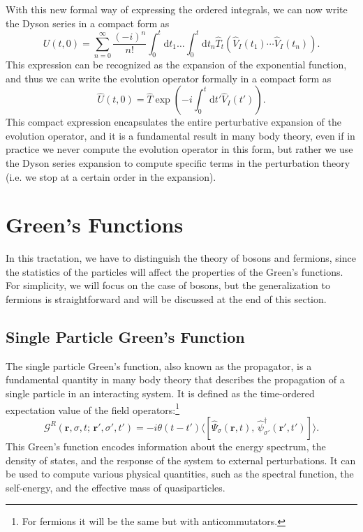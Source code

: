 With this new formal way of expressing the ordered integrals, we can now write the Dyson series in a compact form as
\[
    U(t,0) = \sum_{n=0}^\infty \frac{(-i)^n}{n!} \int_0^t \mathrm{d} t_1 \dots \int_0^t \mathrm{d} t_n \hat{T}_t \left( \hat{V}_I(t_1) \cdots \hat{V}_I(t_n) \right).
\]
This expression can be recognized as the expansion of the exponential function, and thus we can write the evolution operator formally in a compact form as
\[
    \hat{U}(t,0) = \hat{T} \exp\left( -i \int_0^t \mathrm{d} t' \hat{V}_I(t') \right).
\]
This compact expression encapsulates the entire perturbative expansion of the evolution operator, and it is a fundamental result in many body theory, even if in practice we never compute the evolution operator in this form, but rather we use the Dyson series expansion to compute specific terms in the perturbation theory (i.e. we stop at a certain order in the expansion).

\section{Green's Functions}

In this tractation, we have to distinguish the theory of bosons and fermions, since the statistics of the particles will affect the properties of the Green's functions. For simplicity, we will focus on the case of bosons, but the generalization to fermions is straightforward and will be discussed at the end of this section.

\subsection{Single Particle Green's Function}

The single particle Green's function, also known as the propagator, is a fundamental quantity in many body theory that describes the propagation of a single particle in an interacting system. It is defined as the time-ordered expectation value of the field operators:\footnote{For fermions it will be the same but with anticommutators.}
\[
    \mathcal{G}^R(\mathbf{r}, \sigma, t;\,\mathbf{r}', \sigma', t') = -i \theta(t - t') \langle [\hat{\Psi}_{\sigma} (\mathbf{r}, t),\, \hat{\psi}_{\sigma'}^\dagger(\mathbf{r}', t')] \rangle.
\]
This Green's function encodes information about the energy spectrum, the density of states, and the response of the system to external perturbations. It can be used to compute various physical quantities, such as the spectral function, the self-energy, and the effective mass of quasiparticles.

